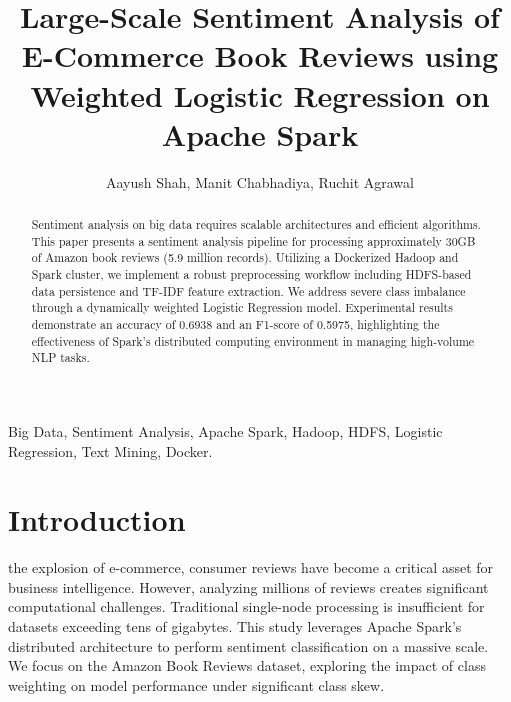 ﻿\documentclass{ieeeaccess}
\begin{document}
\history{}
\doi{}

\title{Large-Scale Sentiment Analysis of E-Commerce Book Reviews using Weighted Logistic Regression on Apache Spark}
\author{Aayush Shah, Manit Chabhadiya, Ruchit Agrawal}
\address[1]{Department of Computer Science}



\begin{abstract}
Sentiment analysis on big data requires scalable architectures and efficient algorithms. This paper presents a sentiment analysis pipeline for processing approximately 30GB of Amazon book reviews (5.9 million records). Utilizing a Dockerized Hadoop and Spark cluster, we implement a robust preprocessing workflow including HDFS-based data persistence and TF-IDF feature extraction. We address severe class imbalance through a dynamically weighted Logistic Regression model. Experimental results demonstrate an accuracy of 0.6938 and an F1-score of 0.5975, highlighting the effectiveness of Spark's distributed computing environment in managing high-volume NLP tasks.
\end{abstract}

\begin{keywords}
Big Data, Sentiment Analysis, Apache Spark, Hadoop, HDFS, Logistic Regression, Text Mining, Docker.
\end{keywords}

\titlepgskip=-15pt

\maketitle
\thispagestyle{plain}

\section{Introduction}
\label{sec:introduction}
 the explosion of e-commerce, consumer reviews have become a critical asset for business intelligence. However, analyzing millions of reviews creates significant computational challenges. Traditional single-node processing is insufficient for datasets exceeding tens of gigabytes. This study leverages Apache Spark's distributed architecture to perform sentiment classification on a massive scale. We focus on the Amazon Book Reviews dataset, exploring the impact of class weighting on model performance under significant class skew.
\end{document}

